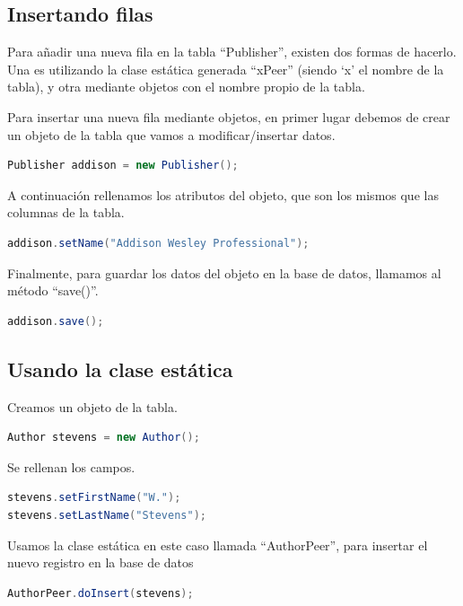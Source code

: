 \documentclass[12pt, oneside]{article}
\begin{document}
\subsection{Insertando filas}

Para añadir una nueva fila en la tabla “Publisher”, existen dos formas de hacerlo. Una es utilizando la clase estática generada “xPeer” (siendo ‘x’ el nombre de la tabla), y otra mediante objetos con el nombre propio de la tabla.

Para insertar una nueva fila mediante objetos, en primer lugar debemos de crear un objeto de la tabla que vamos a modificar/insertar datos.

\begin{lstlisting}[language=Java]
Publisher addison = new Publisher();
\end{lstlisting}

A continuación rellenamos los atributos del objeto, que son los mismos que las columnas de la tabla.

\begin{lstlisting}[language=Java]
addison.setName("Addison Wesley Professional");
\end{lstlisting}

Finalmente, para guardar los datos del objeto en la base de datos, llamamos al método “save()”.

\begin{lstlisting}[language=Java]
addison.save();
\end{lstlisting}

\subsection{Usando la clase estática}
Creamos un objeto de la tabla.

\begin{lstlisting}[language=Java]
Author stevens = new Author();
\end{lstlisting}

Se rellenan los campos.

\begin{lstlisting}[language=Java]
stevens.setFirstName("W.");
stevens.setLastName("Stevens");
\end{lstlisting}

Usamos la clase estática en este caso llamada “AuthorPeer”, para insertar el nuevo registro en la base de datos

\begin{lstlisting}[language=Java]
AuthorPeer.doInsert(stevens);
\end{lstlisting}
\end{document}
